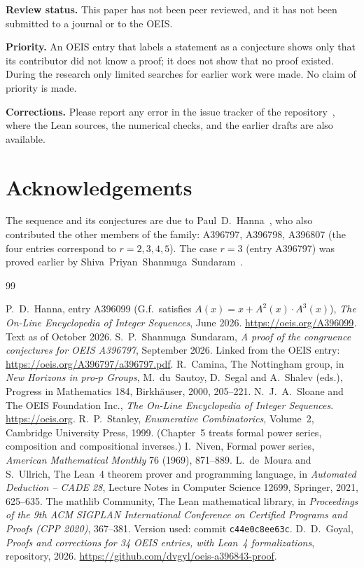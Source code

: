 \documentclass[11pt,a4paper]{article}
\theoremstyle{definition}
\theoremstyle{remark}
\newcommand{\para}[1]{\par\medskip\noindent\textbf{#1}\enspace}
\begin{document}
\para{Review status.} This paper has not been peer reviewed, and it has not been submitted to a journal or to the OEIS.

\para{Priority.} An OEIS entry that labels a statement as a conjecture shows only that its contributor did not know
a proof; it does not show that no proof existed. During the research only limited searches for earlier work were
made. No claim of priority is made.

\para{Corrections.} Please report any error in the issue tracker of the repository~\cite{repo}, where the Lean
sources, the numerical checks, and the earlier drafts are also available.

\section*{Acknowledgements}
The sequence and its conjectures are due to Paul~D.~Hanna~\cite{oeis}, who also contributed the other members of the
family: A396797, A396798, A396807 (the four entries correspond to $r=2,3,4,5$). The case $r=3$ (entry A396797) was
proved earlier by Shiva~Priyan~Shanmuga~Sundaram~\cite{sundaram}. 

\begin{thebibliography}{99}\small
\raggedright
{} P.~D.~Hanna, entry A396099 (G.f.\ satisfies $A(x)=x+A^{2}(x)\cdot A^{3}(x)$), \emph{The On-Line Encyclopedia of Integer Sequences}, June 2026. \url{https://oeis.org/A396099}. Text as of October 2026.
 S.~P.~Shanmuga~Sundaram, \emph{A proof of the congruence conjectures for OEIS A396797}, September 2026. Linked from the OEIS entry: \url{https://oeis.org/A396797/a396797.pdf}.
 R.~Camina, The Nottingham group, in \emph{New Horizons in pro-$p$ Groups}, M.~du~Sautoy, D.~Segal and A.~Shalev (eds.), Progress in Mathematics 184, Birkh\"auser, 2000, 205--221.
 N.~J.~A.~Sloane and The OEIS Foundation Inc., \emph{The On-Line Encyclopedia of Integer Sequences}. \url{https://oeis.org}.
 R.~P.~Stanley, \emph{Enumerative Combinatorics}, Volume~2, Cambridge University Press, 1999. (Chapter~5 treats formal power series, composition and compositional inverses.)
 I.~Niven, Formal power series, \emph{American Mathematical Monthly} 76 (1969), 871--889.
 L.~de~Moura and S.~Ullrich, The Lean~4 theorem prover and programming language, in \emph{Automated Deduction -- CADE 28}, Lecture Notes in Computer Science 12699, Springer, 2021, 625--635.
 The mathlib Community, The Lean mathematical library, in \emph{Proceedings of the 9th ACM SIGPLAN International Conference on Certified Programs and Proofs (CPP 2020)}, 367--381. Version used: commit \texttt{c44e0c8ee63c}.
 D.~D.~Goyal, \emph{Proofs and corrections for 34 OEIS entries, with Lean~4 formalizations}, repository, 2026. \url{https://github.com/dvgyl/oeis-a396843-proof}.
\end{thebibliography}
\end{document}
